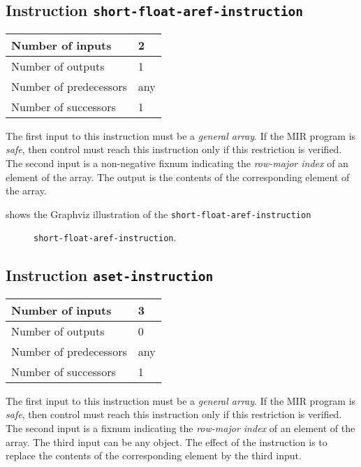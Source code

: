 \subsection{Instruction \texttt{short-float-aref-instruction}}
\label{mir-instruction-short-float-aref}

\begin{tabular}{|l|l|}
\hline
Number of inputs & 2\\
\hline
Number of outputs & 1\\
\hline
Number of predecessors & any\\
\hline
Number of successors & 1\\
\hline
\end{tabular}

The first input to this instruction must be a \emph{general array}.
If the MIR program is \emph{safe}, then control must reach this
instruction only if this restriction is verified.  The second input is
a non-negative fixnum indicating the \emph{row-major index} of an
element of the array.  The output is the contents of the corresponding
element of the array.

 shows the Graphviz illustration of the
\texttt{short-float-aref-instruction}

\begin{figure}
\begin{center}
\end{center}
\caption{\label{fig-short-float-aref-instruction}
\texttt{short-float-aref-instruction}.}
\end{figure}

\subsection{Instruction \texttt{aset-instruction}}
\label{mir-instruction-aset}

\begin{tabular}{|l|l|}
\hline
Number of inputs & 3\\
\hline
Number of outputs & 0\\
\hline
Number of predecessors & any\\
\hline
Number of successors & 1\\
\hline
\end{tabular}

The first input to this instruction must be a \emph{general array}.
If the MIR program is \emph{safe}, then control must reach this
instruction only if this restriction is verified.  The second input is
a fixnum indicating the \emph{row-major index} of an element of the
array.  The third input can be any object.  The effect of the
instruction is to replace the contents of the corresponding element by
the third input.


